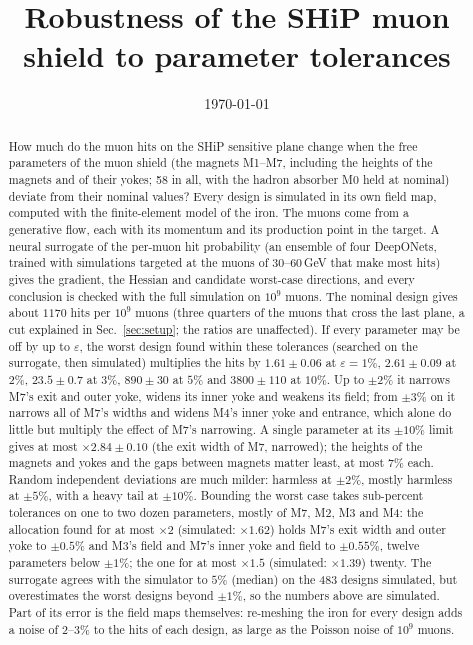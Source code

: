 \documentclass[11pt,a4paper]{article}
\title{Robustness of the SHiP muon shield to parameter tolerances}
\author{}
\date{\today}
\begin{document}
\maketitle

\begin{abstract}
How much do the muon hits on the SHiP sensitive plane change when the free parameters of the
muon shield (the magnets M1--M7, including the heights of the magnets and of their yokes; 58 in
all, with the hadron absorber M0 held at nominal) deviate from their nominal values? Every design
is simulated in its own field map, computed with the finite-element model of the iron. The muons come from a generative flow,
each with its momentum and its production point in the target. A neural surrogate of the per-muon
hit probability (an ensemble of four DeepONets, trained with simulations targeted at the muons of
$30$--$60$\,GeV that make most hits) gives the gradient, the Hessian and candidate worst-case
directions, and every conclusion is checked with the full simulation on $10^9$ muons. The nominal
design gives about $1170$ hits per $10^9$ muons (three quarters of the muons that cross the last
plane, a cut explained in Sec.~\ref{sec:setup}; the ratios are unaffected). If every parameter may be off by up to
$\varepsilon$, the worst design found within these tolerances (searched on the surrogate, then
simulated) multiplies the hits by $1.61\pm0.06$ at $\varepsilon=1\%$, $2.61\pm0.09$ at $2\%$,
$23.5\pm0.7$ at $3\%$, $890\pm30$ at $5\%$ and $3800\pm110$ at $10\%$. Up to $\pm2\%$ it narrows
M7's exit and outer yoke, widens its inner yoke and weakens its field; from $\pm3\%$ on it
narrows all of M7's widths and widens M4's inner yoke and entrance, which alone do little but
multiply the effect of M7's narrowing. A single parameter at its $\pm10\%$ limit gives at most
$\times2.84\pm0.10$ (the exit width of M7, narrowed); the heights of the magnets and yokes and the
gaps between magnets matter least, at most $7\%$ each. Random independent deviations are much
milder: harmless at $\pm2\%$, mostly harmless at $\pm5\%$, with a heavy tail at $\pm10\%$.
Bounding the worst case takes sub-percent tolerances on one to two dozen parameters, mostly of
M7, M2, M3 and M4: the allocation found for at most $\times2$ (simulated: $\times1.62$) holds
M7's exit width and outer yoke to $\pm0.5\%$ and M3's field and M7's inner yoke and field to
$\pm0.55\%$, twelve parameters below $\pm1\%$; the one for at most $\times1.5$ (simulated:
$\times1.39$) twenty. The surrogate agrees with the simulator to $5\%$ (median) on the
483 designs simulated, but overestimates the worst designs beyond $\pm1\%$, so the numbers
above are simulated. Part of its error is the field maps themselves: re-meshing the iron for
every design adds a noise of $2$--$3\%$ to the hits of each design, as large as the Poisson
noise of $10^9$ muons.
\end{abstract}
\end{document}
